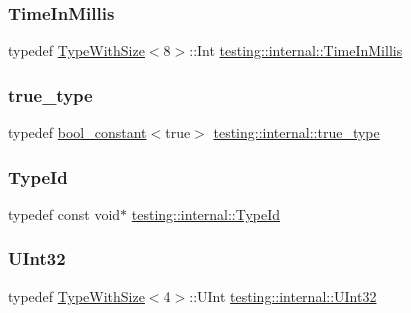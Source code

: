 \subsubsection{\texorpdfstring{Time\+In\+Millis}{TimeInMillis}}
{\footnotesize\ttfamily typedef \hyperlink{classtesting_1_1internal_1_1TypeWithSize}{Type\+With\+Size}$<$8$>$\+::Int \hyperlink{namespacetesting_1_1internal_a66a845df404b38fe85c5e14a069f255a}{testing\+::internal\+::\+Time\+In\+Millis}}

\mbox{\label{namespacetesting_1_1internal_a62f917c3424d8841de9b49b5ec28edb4}} 
\subsubsection{\texorpdfstring{true\+\_\+type}{true\_type}}
{\footnotesize\ttfamily typedef \hyperlink{structtesting_1_1internal_1_1bool__constant}{bool\+\_\+constant}$<$true$>$ \hyperlink{namespacetesting_1_1internal_a62f917c3424d8841de9b49b5ec28edb4}{testing\+::internal\+::true\+\_\+type}}

\mbox{\label{namespacetesting_1_1internal_ab1114197d3c657d8b7f8e0c5caa12d00}} 
\subsubsection{\texorpdfstring{Type\+Id}{TypeId}}
{\footnotesize\ttfamily typedef const void$\ast$ \hyperlink{namespacetesting_1_1internal_ab1114197d3c657d8b7f8e0c5caa12d00}{testing\+::internal\+::\+Type\+Id}}

\mbox{\label{namespacetesting_1_1internal_a40d4fffcd2bf56f18b1c380615aa85e3}} 
\subsubsection{\texorpdfstring{U\+Int32}{UInt32}}
{\footnotesize\ttfamily typedef \hyperlink{classtesting_1_1internal_1_1TypeWithSize}{Type\+With\+Size}$<$4$>$\+::U\+Int \hyperlink{namespacetesting_1_1internal_a40d4fffcd2bf56f18b1c380615aa85e3}{testing\+::internal\+::\+U\+Int32}}

